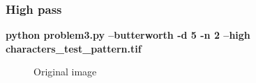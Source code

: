         \pagebreak
        \subsubsection{High pass}

        \small{\textbf{python problem3.py --butterworth -d 5 -n 2 --high characters\_test\_pattern.tif}}

        \begin{figure}[!htb]\centering
            \begin{minipage}{0.40\textwidth}
                \caption{\small{Original image}}
            \end{minipage}
            \begin{minipage}{0.40\textwidth}

\end{minipage}
\end{figure}
